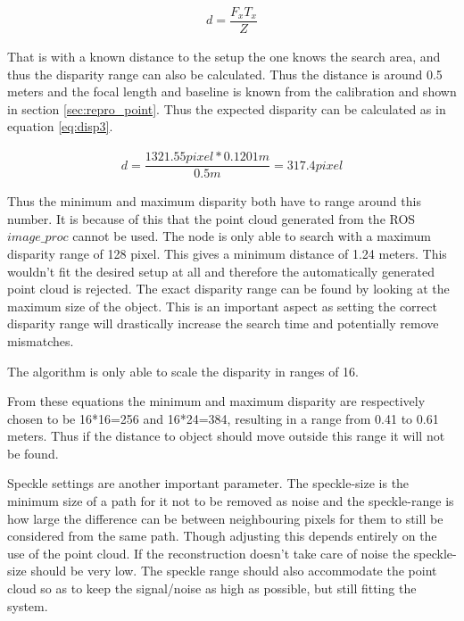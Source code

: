 \begin{equation}\label{eq:disp2}
\begin{split}
 d = \dfrac{F_{x}T_{x}}{ Z}
\end{split}
\end{equation} 

That is with a known distance to the setup the one knows the search area, and thus the disparity range can also be calculated. Thus the distance is around 0.5 meters and the focal length and baseline is known from the calibration and shown in section \ref{sec:repro_point}. Thus the expected disparity can be calculated as in equation \ref{eq:disp3}.

\begin{equation}\label{eq:disp3}
\begin{split}
d = \dfrac{1321.55 pixel*0.1201m}{0.5m} = 317.4 pixel
\end{split}
\end{equation}

Thus the minimum and maximum disparity both have to range around this number. It is because of this that the point cloud generated from the ROS $image\_proc$ cannot be used. The node is only able to search with a maximum disparity range of 128 pixel. This gives a minimum distance of 1.24 meters. This wouldn't fit the desired setup at all and therefore the automatically generated point cloud is rejected. The exact disparity range can be found by looking at the maximum size of the object. This is an important aspect as setting the correct disparity range will drastically increase the search time and potentially remove mismatches.

The algorithm is only able to scale the disparity in ranges of 16.

From these equations the minimum and maximum disparity are respectively chosen to be 16*16=256 and                                   16*24=384, resulting in a range from 0.41 to 0.61 meters. Thus if the distance to object should move outside this range it will not be found.

Speckle settings are another important parameter. The speckle-size is the minimum size of a path for it not to be removed as noise and the speckle-range is how large the difference can be between neighbouring pixels for them to still be considered from the same path. Though adjusting this depends entirely on the use of the point cloud. If the reconstruction doesn't take care of noise the speckle-size should be very low. The speckle range should also accommodate the point cloud so as to keep the signal/noise as high as possible, but still fitting the system. 

